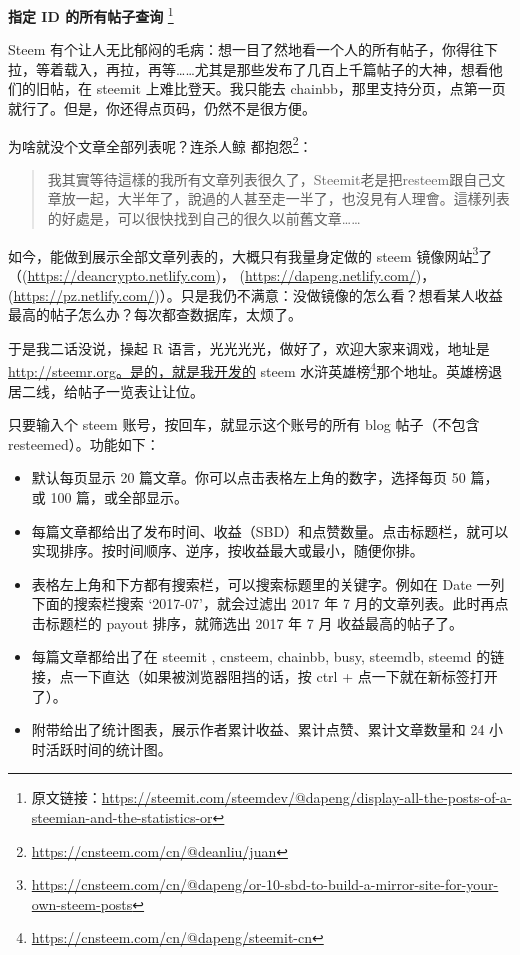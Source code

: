 \documentclass[]{ctexbook}
\renewcommand{\href}[2]{#2\footnote{\url{#1}}}
\begin{document}
\textbf{指定 ID 的所有帖子查询} \footnote{原文链接：\url{https://steemit.com/steemdev/@dapeng/display-all-the-posts-of-a-steemian-and-the-statistics-or}}

Steem 有个让人无比郁闷的毛病：想一目了然地看一个人的所有帖子，你得往下拉，等着载入，再拉，再等\ldots{}\ldots{}尤其是那些发布了几百上千篇帖子的大神，想看他们的旧帖，在 steemit 上难比登天。我只能去 chainbb，那里支持分页，点第一页就行了。但是，你还得点页码，仍然不是很方便。

为啥就没个文章全部列表呢？连杀人鲸 \citet{deanliu} 都\href{https://cnsteem.com/cn/@deanliu/juan}{抱怨}：

\begin{quote}
我其實等待這樣的我所有文章列表很久了，Steemit老是把resteem跟自己文章放一起，大半年了，說過的人甚至走一半了，也沒見有人理會。這樣列表的好處是，可以很快找到自己的很久以前舊文章\ldots{}\ldots{}
\end{quote}

如今，能做到展示全部文章列表的，大概只有我量身定做的 \href{https://cnsteem.com/cn/@dapeng/or-10-sbd-to-build-a-mirror-site-for-your-own-steem-posts}{steem 镜像网站}了（\citep[ 的镜像]{deanliu}(\url{https://deancrypto.netlify.com})， \citep[ 的镜像]{dapeng}(\url{https://dapeng.netlify.com/})， \citep[ 的镜像]{pzhao}(\url{https://pz.netlify.com/})）。只是我仍不满意：没做镜像的怎么看？想看某人收益最高的帖子怎么办？每次都查数据库，太烦了。

于是我二话没说，操起 R 语言，光光光光，做好了，欢迎大家来调戏，地址是 \url{http://steemr.org。是的，就是我开发的} \href{https://cnsteem.com/cn/@dapeng/steemit-cn}{steem 水浒英雄榜}那个地址。英雄榜退居二线，给帖子一览表让让位。

只要输入个 steem 账号，按回车，就显示这个账号的所有 blog 帖子（不包含 resteemed）。功能如下：

\begin{itemize}
\item
  默认每页显示 20 篇文章。你可以点击表格左上角的数字，选择每页 50 篇，或 100 篇，或全部显示。
\item
  每篇文章都给出了发布时间、收益（SBD）和点赞数量。点击标题栏，就可以实现排序。按时间顺序、逆序，按收益最大或最小，随便你排。
\item
  表格左上角和下方都有搜索栏，可以搜索标题里的关键字。例如在 Date 一列下面的搜索栏搜索 `2017-07'，就会过滤出 2017 年 7 月的文章列表。此时再点击标题栏的 payout 排序，就筛选出 2017 年 7 月 收益最高的帖子了。
\item
  每篇文章都给出了在 steemit , cnsteem, chainbb, busy, steemdb, steemd 的链接，点一下直达（如果被浏览器阻挡的话，按 ctrl + 点一下就在新标签打开了）。
\item
  附带给出了统计图表，展示作者累计收益、累计点赞、累计文章数量和 24 小时活跃时间的统计图。
\end{itemize}
\end{document}
